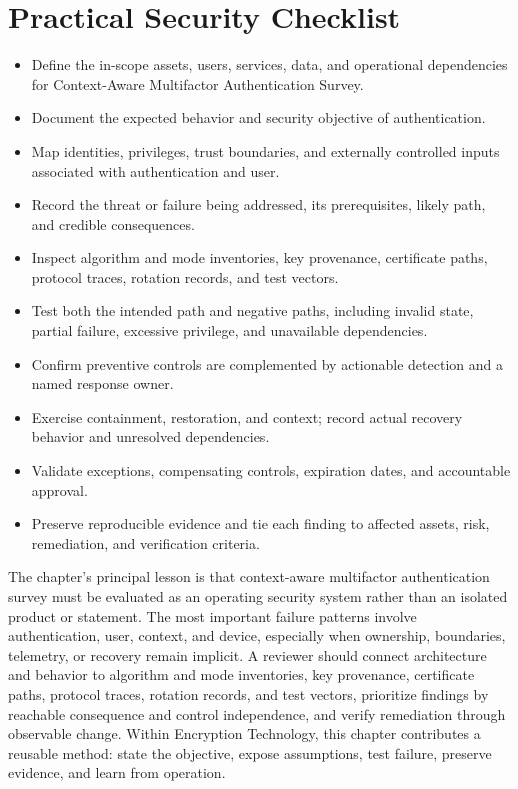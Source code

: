 \documentclass[11pt]{article}
\begin{document}
\section*{Practical Security Checklist}
\begin{itemize}[label=$\square$]
\item Define the in-scope assets, users, services, data, and operational dependencies for Context-Aware Multifactor Authentication Survey.
\item Document the expected behavior and security objective of authentication.
\item Map identities, privileges, trust boundaries, and externally controlled inputs associated with authentication and user.
\item Record the threat or failure being addressed, its prerequisites, likely path, and credible consequences.
\item Inspect algorithm and mode inventories, key provenance, certificate paths, protocol traces, rotation records, and test vectors.
\item Test both the intended path and negative paths, including invalid state, partial failure, excessive privilege, and unavailable dependencies.
\item Confirm preventive controls are complemented by actionable detection and a named response owner.
\item Exercise containment, restoration, and context; record actual recovery behavior and unresolved dependencies.
\item Validate exceptions, compensating controls, expiration dates, and accountable approval.
\item Preserve reproducible evidence and tie each finding to affected assets, risk, remediation, and verification criteria.
\end{itemize}
\begin{synthesisbox}
The chapter's principal lesson is that context-aware multifactor authentication survey must be evaluated as an operating security system rather than an isolated product or statement. The most important failure patterns involve authentication, user, context, and device, especially when ownership, boundaries, telemetry, or recovery remain implicit. A reviewer should connect architecture and behavior to algorithm and mode inventories, key provenance, certificate paths, protocol traces, rotation records, and test vectors, prioritize findings by reachable consequence and control independence, and verify remediation through observable change. Within Encryption Technology, this chapter contributes a reusable method: state the objective, expose assumptions, test failure, preserve evidence, and learn from operation.
\end{synthesisbox}
\end{document}

